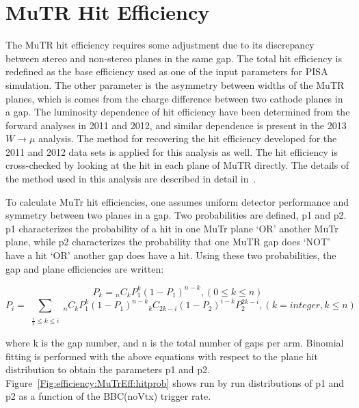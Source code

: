 \section{MuTR Hit Efficiency}
The MuTR hit efficiency requires some adjustment due to its discrepancy between
stereo and non-stereo planes in the same gap. The total hit efficiency is
redefined as the base efficiency used as one of the input parameters for PISA
simulation. The other parameter is the asymmetry between widths of the MuTR
planes, which is comes from the charge difference between two cathode planes in
a gap.  The luminosity dependence of hit efficiency have been determined from
the forward analyses in 2011 and 2012, and similar dependence is present in the
2013 $W\rightarrow\mu$ analysis. The method for recovering the hit efficiency
developed for the 2011 and 2012 data sets is applied for this analysis as well.
The hit efficiency is cross-checked by looking at the hit in each plane of MuTR
directly. The details of the method used in this analysis are described in
detail in~\cite{an1024}.

To calculate MuTr hit efficiencies, one assumes uniform detector performance and
symmetry between two planes in a gap. Two probabilities are defined, p1 and p2.
p1 characterizes the probability of a hit in one MuTr plane `OR' another MuTr
plane, while p2 characterizes the probability that one MuTR gap does `NOT' have
a hit `OR' another gap does have a hit. Using these two probabilities, the gap
and plane efficiencies are written:

\begin{equation}
P_{k}={_n}C_{k}P_{1}^{k}(1-P_{1})^{n-k}, (0\leq k\leq n)
\end{equation}
\begin{equation}
P_{i}=\sum_{\substack{\frac{i}{2}\leq k\leq i}}{_n}C_{k}P_{1}^{k}(1-P_{1})^{n-k}{_k}C_{2k-i}(1-P_{2})^{i-k}P_{2}^{2k-i}, (k=integer, k\leq n)
\end{equation}

{\noindent}where k is the gap number, and n is the total number of gaps per arm.
Binomial fitting is performed with the above equations with respect to the plane
hit distribution to obtain the parameters p1 and p2.
Figure~\ref{Fig:efficiency:MuTrEff:hitprob} shows run by run distributions of p1
and p2 as a function of the BBC(noVtx) trigger rate.

